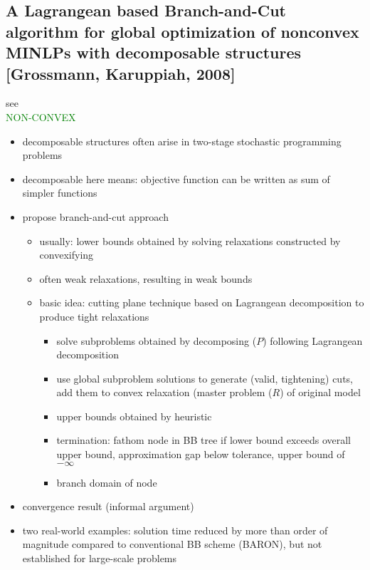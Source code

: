 \documentclass{article}
\begin{document}
\subsection{A Lagrangean based Branch-and-Cut algorithm for global optimization of nonconvex MINLPs with decomposable structures [Grossmann, Karuppiah, 2008]}
see \cite{karuppiah2008lagrangean}\\
\textcolor{green}{NON-CONVEX}
\begin{itemize}
\item decomposable structures often arise in two-stage stochastic programming problems
\item decomposable here means: objective function can be written as sum of simpler functions
\item propose branch-and-cut approach
	\begin{itemize}
	\item usually: lower bounds obtained by solving relaxations constructed by convexifying
	\item often weak relaxations, resulting in weak bounds
	\item basic idea: cutting plane technique based on Lagrangean decomposition to produce tight relaxations
		\begin{itemize}
		\item solve subproblems obtained by decomposing ($P$) following Lagrangean decomposition
		\item use global subproblem solutions to generate (valid, tightening) cuts, add them to convex relaxation (master problem ($R$) of original model
		\item upper bounds obtained by heuristic
		\item termination: fathom node in BB tree if lower bound exceeds overall upper bound, approximation gap below tolerance, upper bound of $-\infty$
		\item branch domain of node
		\end{itemize}
	\end{itemize}
\item convergence result (informal argument)
\item two real-world examples: solution time reduced by more than order of magnitude compared to conventional BB scheme (BARON), but not established for large-scale problems
\end{itemize}
\end{document}
